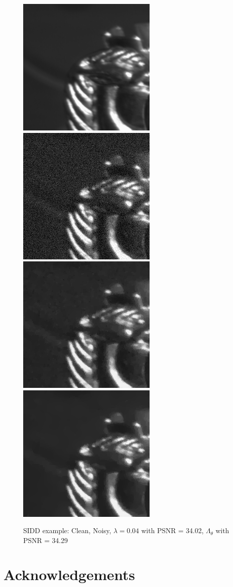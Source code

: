 \documentclass[12pt]{article}
\begin{document}
\begin{figure}[h]
    \centering
    \includegraphics[width=0.34\linewidth]{100-clean.png}
    \includegraphics[width=0.34\linewidth]{100-noisy-mse.png}
    \includegraphics[width=0.34\linewidth]{100-psnr_34.02-lambda_0.04.png}
    \includegraphics[width=0.34\linewidth]{100-denoised-mse_24.42-psnr_34.29-ssim_0.96.png}
    \caption{SIDD example: Clean, Noisy, $\lambda = 0.04$ with PSNR = 34.02, $\Lambda_\theta$ with PSNR = 34.29}
    \label{fig:enter-label}
\end{figure}

\section{Acknowledgements}
\end{document}
